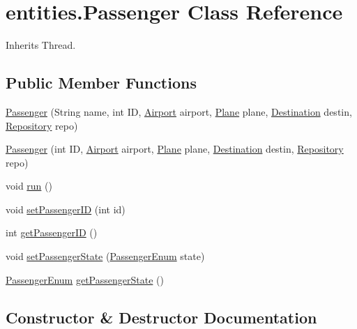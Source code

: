 \hypertarget{classentities_1_1_passenger}{}\section{entities.\+Passenger Class Reference}
\label{classentities_1_1_passenger}


Inherits Thread.

\subsection*{Public Member Functions}
\begin{DoxyCompactItemize}
\item 
\hyperlink{classentities_1_1_passenger_a83a5347da742c0402eb206c771e797d7}{Passenger} (String name, int ID, \hyperlink{classshared_regions_1_1_airport}{Airport} airport, \hyperlink{classshared_regions_1_1_plane}{Plane} plane, \hyperlink{classshared_regions_1_1_destination}{Destination} destin, \hyperlink{classshared_regions_1_1_repository}{Repository} repo)
\item 
\hyperlink{classentities_1_1_passenger_a90938dda88f21caa028a836449c2647c}{Passenger} (int ID, \hyperlink{classshared_regions_1_1_airport}{Airport} airport, \hyperlink{classshared_regions_1_1_plane}{Plane} plane, \hyperlink{classshared_regions_1_1_destination}{Destination} destin, \hyperlink{classshared_regions_1_1_repository}{Repository} repo)
\item 
void \hyperlink{classentities_1_1_passenger_a7d58b79f61a46da11478760937d80c12}{run} ()
\item 
void \hyperlink{classentities_1_1_passenger_a007debe9191129c632c738311e15a7c4}{set\+Passenger\+ID} (int id)
\item 
int \hyperlink{classentities_1_1_passenger_a02039d310b9abd8d76438f86c4dd071f}{get\+Passenger\+ID} ()
\item 
void \hyperlink{classentities_1_1_passenger_a15abb0fe38c3f003d4a7257e8736a562}{set\+Passenger\+State} (\hyperlink{enumentities_1_1_passenger_enum}{Passenger\+Enum} state)
\item 
\hyperlink{enumentities_1_1_passenger_enum}{Passenger\+Enum} \hyperlink{classentities_1_1_passenger_af9b423b481bf216dfe8fe019919e74fe}{get\+Passenger\+State} ()
\end{DoxyCompactItemize}


\subsection{Constructor \& Destructor Documentation}
\mbox{\label{classentities_1_1_passenger_a83a5347da742c0402eb206c771e797d7}} 
